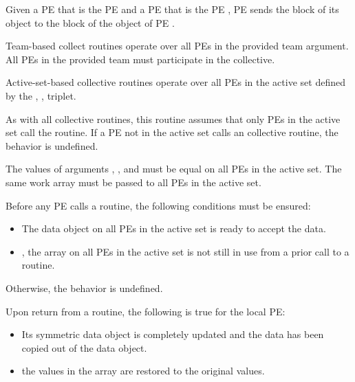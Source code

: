 \begin{apidefinition}
{    Given a \ac{PE}  that is the \kth \ac{PE} 
     and a \ac{PE}
     that is the \lth \ac{PE} 
    ,
    \ac{PE}  sends the \lth block of its  object to
    the \kth block of
    the  object of \ac{PE} .

{\color{Green}
    Team-based collect routines operate over all \acp{PE} in the provided team
    argument. All \acp{PE} in the provided team must participate in the collective.

    Active-set-based collective routines operate over all \acp{PE} in the active set
    defined by the , ,  triplet.
}
    As with all \oldtext{\openshmem}  collective routines,
    this routine assumes that only \acp{PE} in the active set call the routine.
    If a \ac{PE} not in the active set calls an  \oldtext{\openshmem}
     collective routine,
    the behavior is undefined.

    The values of arguments  , ,
    and  must be equal on all \acp{PE} in the active set. The same
      work
    array must be passed to all \acp{PE} in the active set.

    Before any \ac{PE} calls a  routine,
    the following conditions must be ensured:
    \begin{itemize}
    \item The  data object on all \acp{PE} in the active set is
      ready to accept the  data.
    \item {}, the  array
    on all \acp{PE} in the active set is not still in use from a prior call
    to a  routine.
    \end{itemize}
    Otherwise, the behavior is undefined.

    Upon return from a  routine, the following is true for
    the local PE:
    \begin{itemize}
    \item Its  symmetric data object is completely updated and
    the data has been copied out of the  data object.
    \item {}
    the values in the  array are restored to the original values.
    \end{itemize}
}


\end{apidefinition}
